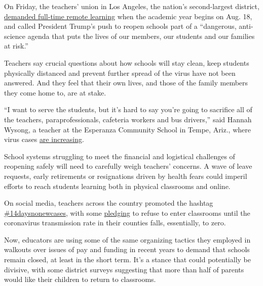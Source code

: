 On Friday, the teachers' union in Los Angeles, the nation's
second-largest district,
\href{https://www.utla.net/news/utla-recommends-keeping-school-campuses-closed}{demanded
full-time remote learning} when the academic year begins on Aug. 18, and
called President Trump's push to reopen schools part of a ``dangerous,
anti-science agenda that puts the lives of our members, our students and
our families at risk.''

Teachers say crucial questions about how schools will stay clean, keep
students physically distanced and prevent further spread of the virus
have not been answered. And they feel that their own lives, and those of
the family members they come home to, are at stake.

``I want to serve the students, but it's hard to say you're going to
sacrifice all of the teachers, paraprofessionals, cafeteria workers and
bus drivers,'' said Hannah Wysong, a teacher at the Esperanza Community
School in Tempe, Ariz., where virus cases
\href{https://www.nytimes.com/interactive/2020/us/arizona-coronavirus-cases.html}{are
increasing}.

School systems struggling to meet the financial and logistical
challenges of reopening safely will need to carefully weigh teachers'
concerns. A wave of leave requests, early retirements or resignations
driven by health fears could imperil efforts to reach students learning
both in physical classrooms and online.

On social media, teachers across the country promoted the hashtag
\href{https://twitter.com/search?q=\%2314daysnonewcases\&src=typed_query}{\#14daysnonewcases},
with some
\href{https://www.change.org/p/u-s-department-of-education-refuse-to-return-to-campus-until-counties-report-no-new-cases-for-14-days?utm_content=cl_sharecopy_23175660_en-US\%3A0\&recruiter=441547298\&recruited_by_id=44bf9f90-9ac2-11e5-a10a-97d04f3cc37d\&utm_source=share_petition\&utm_medium=copylink\&utm_campaign=psf_combo_share_abi\&utm_term=psf_combo_share_abi}{pledging}
to refuse to enter classrooms until the coronavirus transmission rate in
their counties falls, essentially, to zero.

Now, educators are using some of the same organizing tactics they
employed in walkouts over issues of pay and funding in recent years to
demand that schools remain closed, at least in the short term. It's a
stance that could potentially be divisive, with some district surveys
suggesting that more than half of parents would like their children to
return to classrooms.

